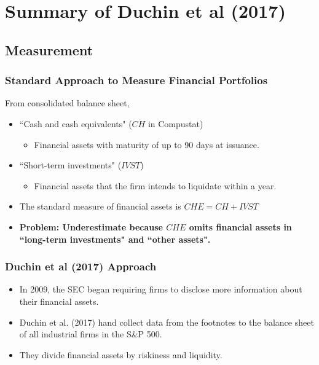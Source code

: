 \documentclass[handout]{beamer}
\begin{document}

\section{Summary of Duchin et al (2017)}

\subsection{Measurement}



\begin{frame}[label=standardapproach]
\frametitle{Standard Approach to Measure Financial Portfolios}
From consolidated balance sheet,
\bigskip
\begin{itemize}[<+->]
\item ``Cash and cash equivalents" ($CH$ in Compustat)
\begin{itemize}
\item Financial assets with maturity of up to 90 days at issuance.
\end{itemize}
\bigskip
\item ``Short-term investments" ($IVST$)
\begin{itemize}
\item Financial assets that the firm intends to liquidate within a year.
\end{itemize}

\bigskip
\item The standard measure of financial assets is $CHE = CH + IVST$

\bigskip

\item \textbf{Problem: Underestimate because $CHE$ omits financial assets in ``long-term investments" and ``other assets".}
\end{itemize}
\bigskip


\hyperlink{APPL2007}{}

\end{frame}


\begin{frame}[label=duchinapproach]
\frametitle{Duchin et al (2017) Approach}
\begin{itemize}[<+->]
\item In 2009, the SEC began requiring firms to disclose more information about their financial assets. \hyperlink{APPL2011}{}
\bigskip
\item Duchin et al. (2017) hand collect data from the footnotes to the balance sheet of all industrial firms in the S\&P 500. 
\bigskip
\item They divide financial assets by riskiness and liquidity. \hyperlink{classify}{}
\end{itemize}

\end{frame}
\end{document}
